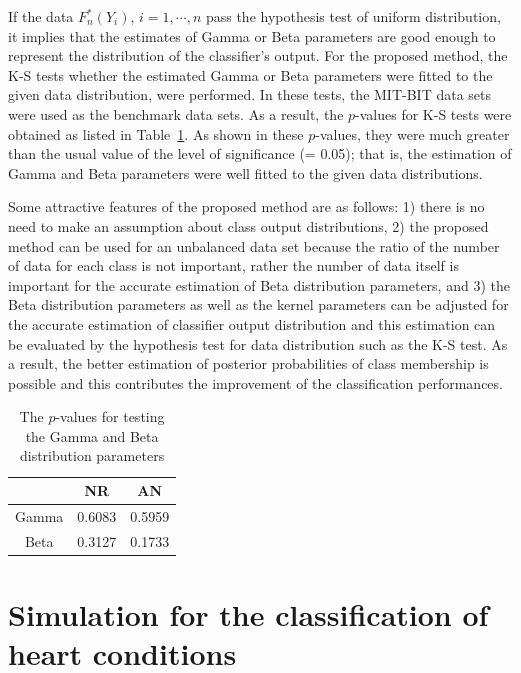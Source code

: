 \documentclass[times,twocolumn,final,authoryear]{elsarticle}
\begin{document}
If the data $F_n^*(Y_i)$, $i=1, \cdots, n$ pass the hypothesis test
of uniform distribution, it implies that the estimates of Gamma or Beta parameters are good enough to represent the distribution of the
classifier's output. For the proposed method, the K-S tests whether the estimated Gamma or Beta parameters were fitted to
the given data distribution, were performed. In these tests, the MIT-BIT data sets were used as the benchmark data sets. As a result, the 
$p$-values for K-S tests were obtained as listed in Table~\ref{T1}. As shown in these $p$-values, they were much greater than the usual value of the level of significance (= 0.05); that is, the estimation of Gamma and Beta parameters were well fitted to the given data distributions.

Some attractive features of the proposed method are as follows: 1) there is no need to make an assumption about class output distributions, 2) the proposed method can be used for an unbalanced data set because the ratio of the number of data for each class is not important, rather the number of data itself is important for the accurate estimation of Beta distribution parameters, and 3) the Beta distribution parameters as well as the kernel parameters can be adjusted for the accurate estimation of classifier output distribution and this estimation can be evaluated by the hypothesis test for data distribution such as the K-S test. As a result, the better estimation of posterior probabilities of class membership is possible and this contributes the improvement of the classification performances. 

\begin{table}
\caption{The $p$-values for testing the Gamma and Beta distribution parameters} \label{T1}
\begin{center}
\begin{tabular}{|c||c|c|}\hline\hline
                   & NR     & AN   \\ \hline\hline
Gamma       & 0.6083  & 0.5959 \\ \hline
Beta            & 0.3127  & 0.1733 \\ \hline
\end{tabular}
\end{center}
\end{table}

\section{Simulation for the classification of heart conditions}
\end{document}
